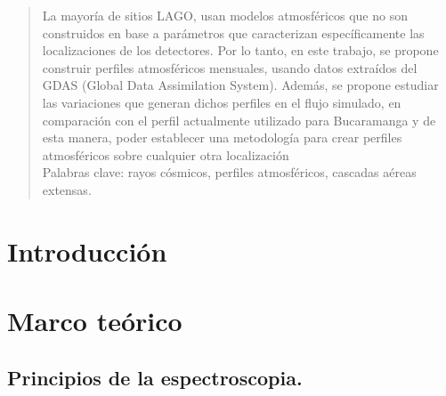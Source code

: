 \documentclass[11pt]{article}
\begin{document}
\begin{abstract}



La mayoría de sitios LAGO, usan modelos atmosféricos que no son construidos en base a parámetros que caracterizan específicamente las localizaciones de los detectores. 
Por lo tanto, en este trabajo, se propone construir perfiles atmosféricos mensuales, usando datos extraídos del GDAS (Global Data Assimilation System). 
Además, se propone estudiar las variaciones que generan dichos perfiles en el flujo simulado, en comparación con el perfil actualmente utilizado para Bucaramanga y de esta manera, poder establecer una metodología para crear perfiles atmosféricos sobre cualquier otra localización \cite{moreira2009modelo}\\


\vspace{0.5cm}
Palabras clave: rayos cósmicos, perfiles atmosféricos, cascadas aéreas extensas.

\end{abstract}


\section{Introducci\'on}












\section{Marco teórico}

\subsection {Principios de la espectroscopia.}
\end{document}
